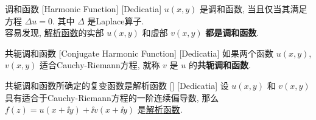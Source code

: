 \documentclass[UTF8]{ctexart}
\newcommand{\AnalyticalFunction}{\hyperref[dfn:AnalyticalFunction]{解析函数}}
\begin{document}
\begin{dfn}
    [UUID]
    {调和函数}
    [Harmonic Function]
    [Dedicatia]
     \( u(x,y) \) 是调和函数, 当且仅当其满足方程 \( \Delta u=0 \). 其中 \( \Delta \) 是Laplace算子. \\
    容易发现, \AnalyticalFunction 的实部 \( u(x,y) \) 和虚部 \( v(x,y) \) \textbf{都是调和函数}. 
\end{dfn}
\begin{dfn}
    [UUID]
    {共轭调和函数}
    [Conjugate Harmonic Function]
    [Dedicatia]
    如果两个函数 \( u(x,y) \),  \( v(x,y) \) 适合Cauchy-Riemann方程, 就称 \( v \) 是 \( u \) 的\textbf{共轭调和函数}. 
\end{dfn}
\begin{thm}
    [UUID]
    {共轭调和函数所确定的复变函数是解析函数}
    []
    [Dedicatia]
    设 \( u(x,y) \) 和 \( v(x,y) \) 具有适合于Cauchy-Riemann方程的一阶连续偏导数, 那么 \( f(z)=u(x+\ii y)+\ii v(x+\ii y) \) 是\AnalyticalFunction. 
\end{thm}
\end{document}
